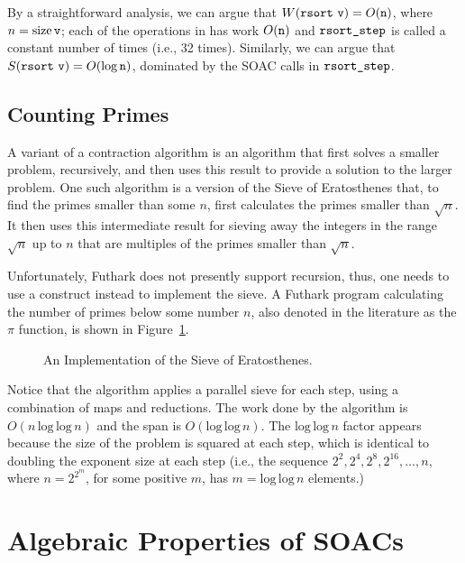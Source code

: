 \documentclass[oneside,11pt]{book}
\newcommand{\size}{\ensuremath{\mathrm{size}}}
\renewcommand{\log}{\ensuremath{\mathrm{log}}}
\newenvironment{wrap}{\vspace{\topskip}\par\noindent\begin{minipage}{\linewidth}}{\end{minipage}\par}
\begin{document}
By a straightforward analysis, we can argue that $W(\texttt{rsort}~\texttt{v})
= O(\texttt{n})$, where $n = \size\,\kw{v}$; each of the operations in
 has work $O(\texttt{n})$ and $\texttt{rsort\_step}$ is called
a constant number of times (i.e., 32 times). Similarly, we can argue
that $S(\kw{rsort}~\kw{v}) = O(\log\,\kw{n})$, dominated by the
 SOAC calls in $\texttt{rsort\_step}$.

\section{Counting Primes}
A variant of a contraction algorithm is an algorithm that first solves
a smaller problem, recursively, and then uses this result to provide a
solution to the larger problem. One such algorithm is a version of the
Sieve of Eratosthenes that, to find the primes smaller than some $n$,
first calculates the primes smaller than $\sqrt n$. It then uses this
intermediate result for sieving away the integers in the range $\sqrt
n$ up to $n$ that are multiples of the primes smaller than $\sqrt n$.

Unfortunately, Futhark does not presently support recursion, thus, one
needs to use a  construct instead to implement the sieve.  A
Futhark program calculating the number of primes below some number
$n$, also denoted in the literature as the $\pi$ function, is shown in
Figure~\ref{fig:primes}.

\begin{figure}
\begin{wrap}

\end{wrap}
\caption{An Implementation of the Sieve of Eratosthenes.}
\label{fig:primes}
\end{figure}

Notice that the algorithm applies a parallel sieve for each step,
using a combination of maps and reductions. The work done by the
algorithm is $O(n\,\log\,\log\,n)$ and the span is
$O(\log\,\log\,n)$. The $\log\,\log\,n$ factor appears because the
size of the problem is squared at each step, which is identical to doubling the exponent size at each
step (i.e., the sequence $2^2, 2^4, 2^8, 2^{16}, \ldots, n$, where $n=2^{2^m}$, for some positive $m$, has $m = \log\,\log\,n$ elements.)

\chapter{Algebraic Properties of SOACs}
\label{chap:soac-algebra}
\end{document}
